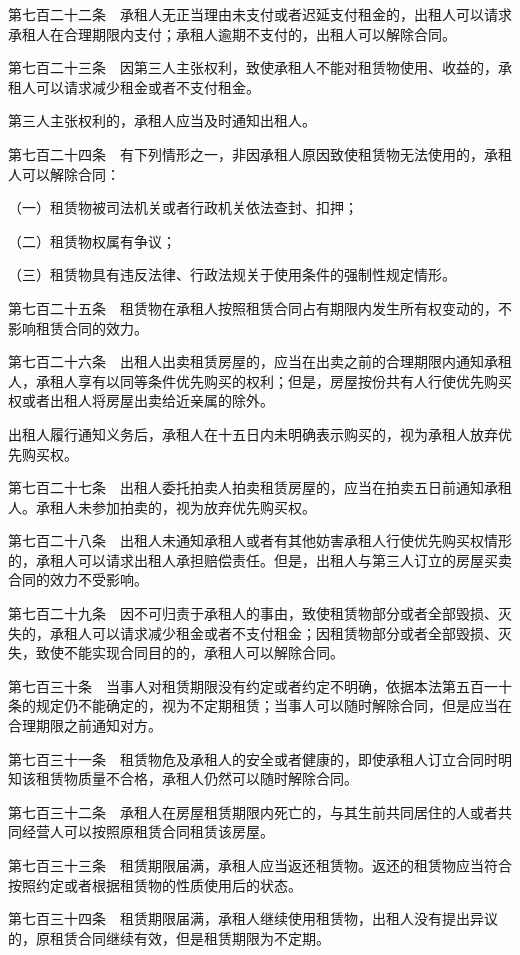 \documentclass[UTF8,12pt,a4paper]{ctexbook}
\begin{document}
第七百二十二条　承租人无正当理由未支付或者迟延支付租金的，出租人可以请求承租人在合理期限内支付；承租人逾期不支付的，出租人可以解除合同。

第七百二十三条　因第三人主张权利，致使承租人不能对租赁物使用、收益的，承租人可以请求减少租金或者不支付租金。

第三人主张权利的，承租人应当及时通知出租人。

第七百二十四条　有下列情形之一，非因承租人原因致使租赁物无法使用的，承租人可以解除合同：

（一）租赁物被司法机关或者行政机关依法查封、扣押；

（二）租赁物权属有争议；

（三）租赁物具有违反法律、行政法规关于使用条件的强制性规定情形。

第七百二十五条　租赁物在承租人按照租赁合同占有期限内发生所有权变动的，不影响租赁合同的效力。

第七百二十六条　出租人出卖租赁房屋的，应当在出卖之前的合理期限内通知承租人，承租人享有以同等条件优先购买的权利；但是，房屋按份共有人行使优先购买权或者出租人将房屋出卖给近亲属的除外。

出租人履行通知义务后，承租人在十五日内未明确表示购买的，视为承租人放弃优先购买权。

第七百二十七条　出租人委托拍卖人拍卖租赁房屋的，应当在拍卖五日前通知承租人。承租人未参加拍卖的，视为放弃优先购买权。

第七百二十八条　出租人未通知承租人或者有其他妨害承租人行使优先购买权情形的，承租人可以请求出租人承担赔偿责任。但是，出租人与第三人订立的房屋买卖合同的效力不受影响。

第七百二十九条　因不可归责于承租人的事由，致使租赁物部分或者全部毁损、灭失的，承租人可以请求减少租金或者不支付租金；因租赁物部分或者全部毁损、灭失，致使不能实现合同目的的，承租人可以解除合同。

第七百三十条　当事人对租赁期限没有约定或者约定不明确，依据本法第五百一十条的规定仍不能确定的，视为不定期租赁；当事人可以随时解除合同，但是应当在合理期限之前通知对方。

第七百三十一条　租赁物危及承租人的安全或者健康的，即使承租人订立合同时明知该租赁物质量不合格，承租人仍然可以随时解除合同。

第七百三十二条　承租人在房屋租赁期限内死亡的，与其生前共同居住的人或者共同经营人可以按照原租赁合同租赁该房屋。

第七百三十三条　租赁期限届满，承租人应当返还租赁物。返还的租赁物应当符合按照约定或者根据租赁物的性质使用后的状态。

第七百三十四条　租赁期限届满，承租人继续使用租赁物，出租人没有提出异议的，原租赁合同继续有效，但是租赁期限为不定期。
\end{document}
